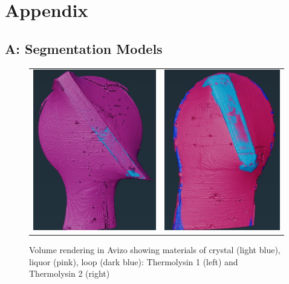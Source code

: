 \printbibliography
\newpage

\appendix
\noindent
\section{Appendix}
\subsection{A: Segmentation Models}

\begin{figure}[h]
    \begin{tabular}{cc}
    	\includegraphics[height=7cm ]{images/avizo_flats/tlys9.jpg} & \includegraphics[height=7cm]{images/avizo_flats/tlys2.jpg}
    \end{tabular}
	\caption{Volume rendering in Avizo showing materials of crystal (light blue), liquor (pink), loop (dark blue): Thermolysin 1 (left) and Thermolysin 2 (right)}
 \label{tlys2}
\end{figure}


